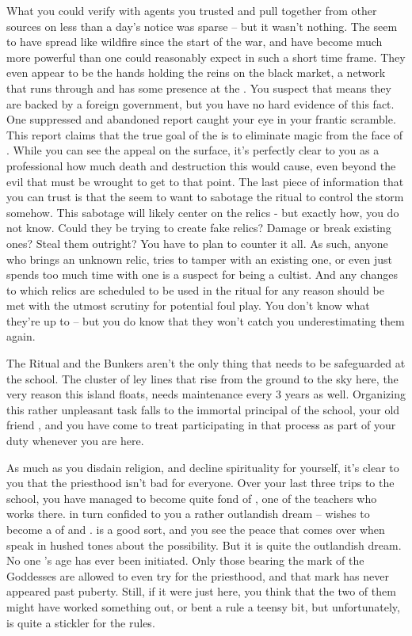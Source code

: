 \documentclass[char]{GL2020}
\begin{document}
What you could verify with agents you trusted and pull together from other sources on less than a day's notice was sparse -- but it wasn’t nothing. The \pGoaties{} seem to have spread like wildfire since the start of the war, and have become much more powerful than one could reasonably expect in such a short time frame. They even appear to be the hands holding the reins on the black market, a network that runs through \pShip{} and has some presence at the \pSc{}.  You suspect that means they are backed by a foreign government, but you have no hard evidence of this fact. One suppressed and abandoned report caught your eye in your frantic scramble. This report claims that the true goal of the \pGoaties{} is to eliminate magic from the face of \pEarth{}. While you can see the appeal on the surface, it’s perfectly clear to you as a professional how much death and destruction this would cause, even beyond the evil that must be wrought to get to that point. The last piece of information that you can trust is that the \pGoaties{} seem to want to sabotage the ritual to control the storm somehow. This sabotage will likely center on the relics - but exactly how, you do not know. Could they be trying to create fake relics? Damage or break existing ones? Steal them outright? You have to plan to counter it all. As such, anyone who brings an unknown relic, tries to tamper with an existing one, or even just spends too much time with one is a suspect for being a cultist. And any changes to which relics are scheduled to be used in the ritual for any reason should be met with the utmost scrutiny for potential foul play. You don’t know what they’re up to -- but you do know that they won’t catch you underestimating them again.

The Ritual and the Bunkers aren’t the only thing that needs to be safeguarded at the school. The cluster of ley lines that rise from the ground to the sky here, the very reason this island floats, needs maintenance every 3 years as well. Organizing this rather unpleasant task falls to the immortal principal of the school, your old friend \cPrincipal{}, and you have come to treat participating in that process as part of your duty whenever you are here.

As much as you disdain religion, and decline spirituality for yourself, it’s clear to you that the priesthood isn’t bad for everyone. Over your last three trips to the school, you have managed to become quite fond of \cPirate{}, one of the \pShip{} teachers who works there. \cPirate{\They} in turn \cPirate{\have} confided to you a rather outlandish dream -- \cPirate{} wishes to become a \cPirate{\cleric} of \cEbb{} and \cFlow{}. \cPirate{} is a good sort, and you see the peace that comes over \cPirate{\them} when \cPirate{\they} speak in hushed tones about the possibility. But it is quite the outlandish dream. No one \cPirate{}’s age has ever been initiated. Only those bearing the mark of the Goddesses are allowed to even try for the priesthood, and that mark has never appeared past puberty. Still, if it were just \cFlowPriest{} here, you think that the two of them might have worked something out, or bent a rule a teensy bit, but unfortunately, \cEbbPriest{} is quite a stickler for the rules.
\end{document}
